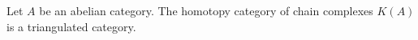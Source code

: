 

    Let $A$ be an abelian category. The homotopy category of chain complexes $K(A)$ is a triangulated category. 
